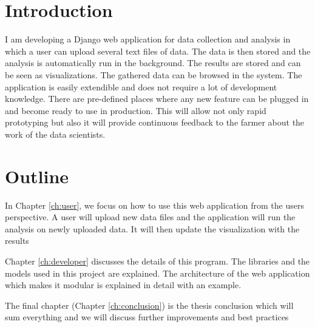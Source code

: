 \section{Introduction}

I am developing a Django web application for data collection and analysis in which a user can
upload several text files of data. The data is then stored and the analysis is automatically run in the
background. The results are stored and can be seen as visualizations. The gathered data can be browsed in the system.
The application is easily extendible and does not require a lot of development knowledge. There are pre-defined places where
any new feature can be plugged in and become ready to use in production. This will allow not only rapid prototyping
but also it will provide continuous feedback to the farmer about the work of the data scientists.

\section{Outline}

In Chapter \ref{ch:user}, we focus on how to use this web application from the users perspective. 
A user will upload new data files and the application will run the analysis on newly uploaded data.
It will then update the visualization with the results

Chapter \ref{ch:developer} discusses the details of this program.
The libraries and the models used in this project are explained. 
The architecture of the web application which makes it modular is explained in detail with an example.

The final chapter (Chapter \ref{ch:conclusion}) is the thesis conclusion 
which will sum everything and we will discuss further improvements and best practices